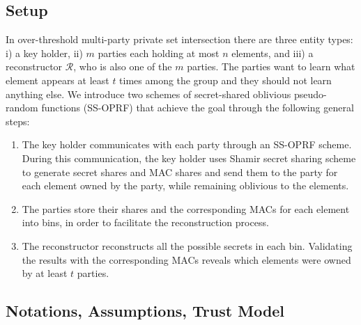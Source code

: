 \subsection{Setup}
In over-threshold multi-party private set intersection there are three entity types: i) a key holder, ii) $m$ parties each holding at most $n$ elements, and iii) a reconstructor $\mathcal{R}$, who is also one of the $m$ parties. The parties want to learn what element appears at least $t$ times among the group and they should not learn anything else. We introduce two schemes of secret-shared oblivious pseudo-random functions (SS-OPRF) that achieve the goal through the following general steps:
\begin{enumerate}[label=(\alph*)]
    \item The key holder communicates with each party through an SS-OPRF scheme. During this communication, the key holder uses Shamir secret sharing scheme \cite{Shamir} to generate secret shares and MAC shares and send them to the party for each element owned by the party, while remaining oblivious to the elements. 
    \item The parties store their shares and the corresponding MACs for each element into bins, in order to facilitate the reconstruction process. 
    \item The reconstructor reconstructs all the possible secrets in each bin. Validating the results with the corresponding MACs reveals which elements were owned by at least $t$ parties. 
\end{enumerate}

\subsection{Notations, Assumptions, Trust Model}
